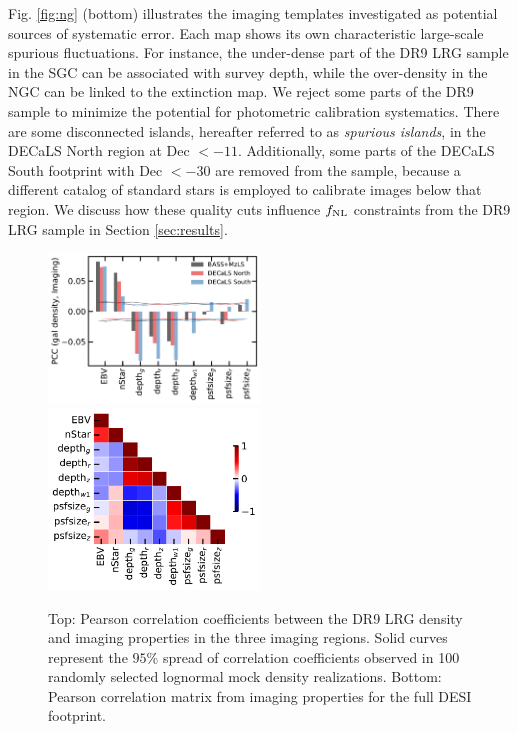 Fig. \ref{fig:ng} (bottom) illustrates the imaging templates investigated as potential sources of systematic error. Each map shows its own characteristic large-scale spurious fluctuations. For instance, the under-dense part of the DR9 LRG sample in the SGC can be associated with survey depth, while the over-density in the NGC can be linked to the extinction map. We reject some parts of the DR9 sample to minimize the potential for photometric calibration systematics. There are some disconnected islands, hereafter referred to as \textit{spurious islands}, in the DECaLS North region at Dec $< -11$. Additionally, some parts of the DECaLS South footprint with Dec $< -30$ are removed from the sample, because a different catalog of standard stars is employed to calibrate images below that region. We discuss how these quality cuts influence $f_{\rm NL}$ constraints from the DR9 LRG sample in Section \ref{sec:results}. 

\begin{figure}
 \includegraphics[width=0.5\textwidth]{figures/pcc.pdf} 
 \includegraphics[width=0.5\textwidth]{figures/pccx.pdf}  
 \caption{Top: Pearson correlation coefficients between the DR9 LRG density and imaging properties in the three imaging regions. Solid curves represent the $95\%$ spread of correlation coefficients observed in 100 randomly selected lognormal mock density realizations. Bottom: Pearson correlation matrix from imaging properties for the full DESI footprint.}
 \label{fig:pcc}
\end{figure}



